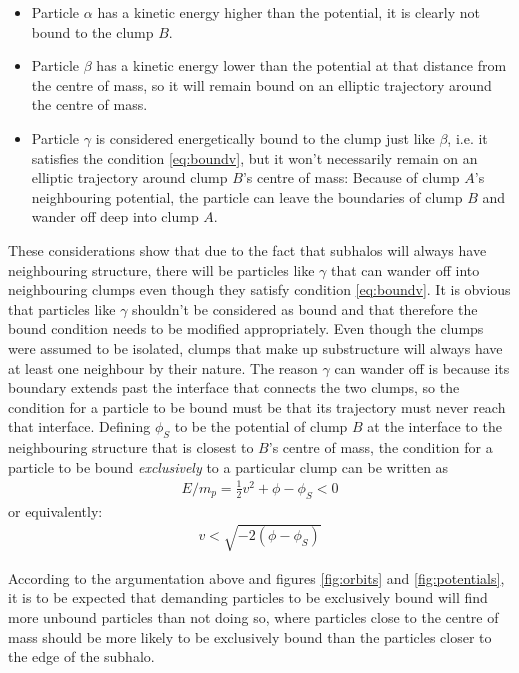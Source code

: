 \begin{itemize}
	\item Particle $\alpha$ has a kinetic energy higher than the potential, it is clearly not bound to the clump $B$.
	\item Particle $\beta$ has a kinetic energy lower than the potential at that distance from the centre of mass, so it will remain bound on an elliptic trajectory around the centre of mass.
	\item Particle $\gamma$ is considered energetically bound to the clump just like $\beta$, i.e. it satisfies the condition \eqref{eq:boundv}, but it won't necessarily remain on an elliptic trajectory around clump $B$'s centre of mass: Because of clump $A$'s neighbouring potential, the particle can leave the boundaries of clump $B$ and wander off deep into clump $A$.
\end{itemize}
%

These considerations show that due to the fact that subhalos will always have neighbouring structure, there will be particles like $\gamma$ that can wander off into neighbouring clumps even though they satisfy condition \eqref{eq:boundv}.
It is obvious that particles like $\gamma$ shouldn't be considered as bound and that therefore the bound condition needs to be modified appropriately.
Even though the clumps were assumed to be isolated, clumps that make up substructure will always have at least one neighbour by their nature.
The reason $\gamma$ can wander off is because its boundary extends past the interface that connects the two clumps, so the condition for a particle to be bound must be that its trajectory must never reach that interface.
Defining $\phi_S$ to be the potential of clump $B$ at the interface to the neighbouring structure that is closest to $B$'s centre of mass, the condition for a particle to be bound \emph{exclusively} to a particular clump can be written as
%
\begin{align}
	E/m_p = \frac{1}{2}v^2 + \phi -  \phi_S < 0
\end{align}
%
or equivalently:
%
\begin{align}
	v < \sqrt{ - 2(\phi - \phi_S) } \label{eq:boundv_corr}
\end{align}


According to the argumentation above and figures \ref{fig:orbits} and \ref{fig:potentials}, it is to be expected that demanding particles to be exclusively bound will find more unbound particles than not doing so, where particles close to the centre of mass should be more likely to be exclusively bound than the particles closer to the edge of the subhalo.












